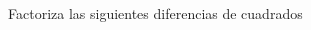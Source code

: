 \documentclass[12pt,addpoints]{evalua}
\begin{document}
\begin{questions}
\begin{multicols}{2}
      \end{multicols}


      \subsection*{\else{}\fi}
      \question[4] Factoriza las siguientes diferencias de cuadrados

      \begin{multicols}{2}
\end{multicols}
\end{questions}
\end{document}
